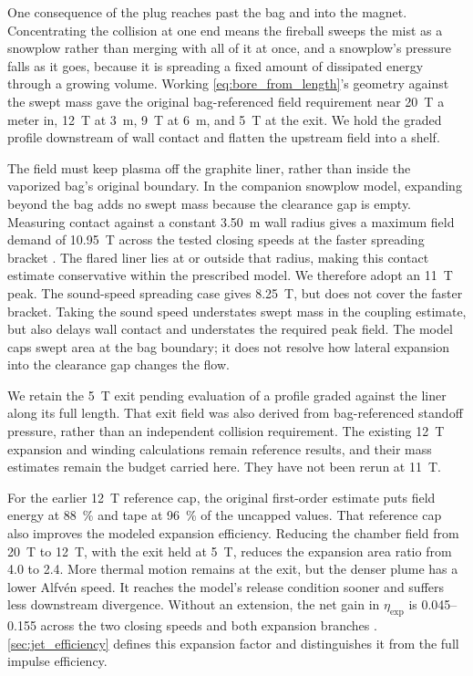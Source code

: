 \documentclass{article}
\begin{document}
One consequence of the plug reaches past the bag and into the magnet. Concentrating the collision at one end means the fireball sweeps the mist as a snowplow rather than merging with all of it at once, and a snowplow's pressure falls as it goes, because it is spreading a fixed amount of dissipated energy through a growing volume. Working \autoref{eq:bore_from_length}'s geometry against the swept mass gave the original bag-referenced field requirement near \SI{20}{\tesla} a meter in, \SI{12}{\tesla} at \SI{3}{\meter}, \SI{9}{\tesla} at \SI{6}{\meter}, and \SI{5}{\tesla} at the exit. We hold the graded profile downstream of wall contact and flatten the upstream field into a shelf.

The field must keep plasma off the graphite liner, rather than inside the vaporized bag's original boundary. In the companion snowplow model, expanding beyond the bag adds no swept mass because the clearance gap is empty. Measuring contact against a constant \SI{3.50}{\meter} wall radius gives a maximum field demand of \SI{10.95}{\tesla} across the tested closing speeds at the faster spreading bracket \cite{Katz_puffsat_impact_sim_2026}. The flared liner lies at or outside that radius, making this contact estimate conservative within the prescribed model. We therefore adopt an \SI{11}{\tesla} peak. The sound-speed spreading case gives \SI{8.25}{\tesla}, but does not cover the faster bracket. Taking the sound speed understates swept mass in the coupling estimate, but also delays wall contact and understates the required peak field. The model caps swept area at the bag boundary; it does not resolve how lateral expansion into the clearance gap changes the flow.

We retain the \SI{5}{\tesla} exit pending evaluation of a profile graded against the liner along its full length. That exit field was also derived from bag-referenced standoff pressure, rather than an independent collision requirement. The existing \SI{12}{\tesla} expansion and winding calculations remain reference results, and their mass estimates remain the budget carried here. They have not been rerun at \SI{11}{\tesla}.

For the earlier \SI{12}{\tesla} reference cap, the original first-order estimate puts field energy at \SI{88}{\percent} and tape at \SI{96}{\percent} of the uncapped values. That reference cap also improves the modeled expansion efficiency. Reducing the chamber field from \SI{20}{\tesla} to \SI{12}{\tesla}, with the exit held at \SI{5}{\tesla}, reduces the expansion area ratio from 4.0 to 2.4. More thermal motion remains at the exit, but the denser plume has a lower Alfv\'en speed. It reaches the model's release condition sooner and suffers less downstream divergence. Without an extension, the net gain in $\eta_{\mathrm{exp}}$ is \numrange{0.045}{0.155} across the two closing speeds and both expansion branches \cite{Katz_puffsat_impact_sim_2026}. \autoref{sec:jet_efficiency} defines this expansion factor and distinguishes it from the full impulse efficiency.
\end{document}
